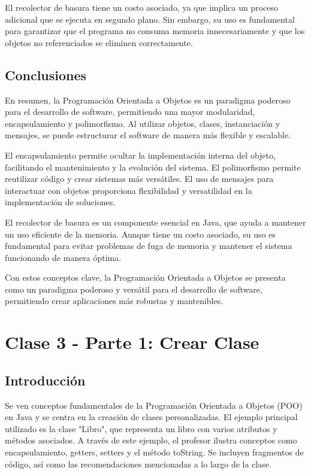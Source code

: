 \documentclass[a4paper]{report}
\begin{document}
El recolector de basura tiene un costo asociado, ya que implica un proceso adicional que se ejecuta en segundo plano. Sin embargo, su uso es fundamental para garantizar que el programa no consuma memoria innecesariamente y que los objetos no referenciados se eliminen correctamente.

\section{Conclusiones}
En resumen, la Programación Orientada a Objetos es un paradigma poderoso para el desarrollo de software, permitiendo una mayor modularidad, encapsulamiento y polimorfismo. Al utilizar objetos, clases, instanciación y mensajes, se puede estructurar el software de manera más flexible y escalable.

El encapsulamiento permite ocultar la implementación interna del objeto, facilitando el mantenimiento y la evolución del sistema. El polimorfismo permite reutilizar código y crear sistemas más versátiles. El uso de mensajes para interactuar con objetos proporciona flexibilidad y versatilidad en la implementación de soluciones.

El recolector de basura es un componente esencial en Java, que ayuda a mantener un uso eficiente de la memoria. Aunque tiene un costo asociado, su uso es fundamental para evitar problemas de fuga de memoria y mantener el sistema funcionando de manera óptima.

Con estos conceptos clave, la Programación Orientada a Objetos se presenta como un paradigma poderoso y versátil para el desarrollo de software, permitiendo crear aplicaciones más robustas y mantenibles.

\newpage
\maketitle

\chapter{Clase 3 - Parte 1: Crear Clase}
\section{Introducción}
Se ven conceptos fundamentales de la Programación Orientada a Objetos (POO) en Java y se centra en la creación de clases personalizadas. El ejemplo principal utilizado es la clase "Libro", que representa un libro con varios atributos y métodos asociados. A través de este ejemplo, el profesor ilustra conceptos como encapsulamiento, getters, setters y el método toString. Se incluyen fragmentos de código, así como las recomendaciones mencionadas a lo largo de la clase.
\end{document}
